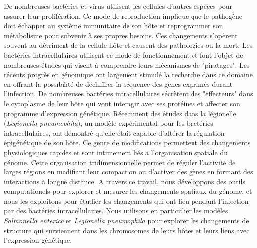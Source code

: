 De nombreuses bactéries et virus utilisent les cellules d'autres espèces pour assurer leur prolifération. Ce mode de reproduction implique que le pathogène doit échapper au système immunitaire de son hôte et reprogrammer son métabolisme pour subvenir à ses propres besoins. Ces changements s'opèrent souvent au détriment de la cellule hôte et causent des pathologies ou la mort. Les bactéries intracellulaires utilisent ce mode de fonctionnement et font l'objet de nombreuses études qui visent à comprendre leurs mécanismes de "piratages". Les récents progrès en génomique ont largement stimulé la recherche dans ce domaine en offrant la possibilité de déchiffrer la séquence des gènes exprimés durant l'infection. De nombreuses bactéries intracellulaires sécrètent des "effecteurs" dans le cytoplasme de leur hôte qui vont interagir avec ses protéines et affecter son programme d'expression génétique. Récemment des études dans la légionelle (\textit{Legionella pneumophila}), un modèle expérimental pour les bactéries intracellulaires, ont démontré qu'elle était capable d'altérer la régulation épigénétique de son hôte. Ce genre de modifications permettent des changements physiologiques rapides et sont intimement liés a l'organisation spatiale du génome. Cette organisation tridimensionnelle permet de réguler l'activité de larges régions en modifiant leur compaction ou d'activer des gènes en formant des interactions à longue distance. A travers ce travail, nous développons des outils computationels pour explorer et mesurer les changements spatiaux du génome, et nous les exploitons pour étudier les changements qui ont lieu pendant l'infection par des bactéries intracellulaires. Nous utilisons en particulier les modèles \textit{Salmonella enterica } et \textit{Legionella pneumophila} pour explorer les changements de structure qui surviennent dans les chromosomes de leurs hôtes et leurs liens avec l'expression génétique.
